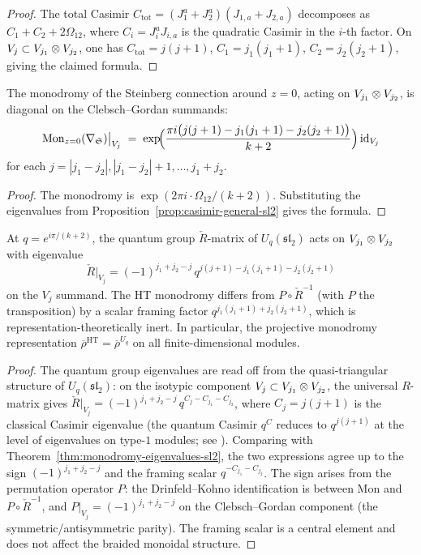 \begin{proof}
The total Casimir $C_{\mathrm{tot}} = (J^a_1 + J^a_2)(J_{1,a} + J_{2,a})$ decomposes as $C_1 + C_2 + 2\Omega_{12}$, where $C_i = J^a_i J_{i,a}$ is the quadratic Casimir in the $i$-th factor. On $V_j \subset V_{j_1} \otimes V_{j_2}$, one has $C_{\mathrm{tot}} = j(j+1)$, $C_1 = j_1(j_1+1)$, $C_2 = j_2(j_2+1)$, giving the claimed formula.
\end{proof}

\begin{theorem}
\label{thm:monodromy-eigenvalues-sl2}
The monodromy of the Steinberg connection around $z = 0$, acting on $V_{j_1} \otimes V_{j_2}$, is diagonal on the Clebsch--Gordan summands:
\[
 \mathrm{Mon}_{z=0}(\nabla_{\mathfrak{S}})\big|_{V_j}
 \;=\;
 \exp\!\Bigl(\frac{\pi i\bigl(j(j+1) - j_1(j_1+1) - j_2(j_2+1)\bigr)}{k+2}\Bigr)\,\mathrm{id}_{V_j}
\]
for each $j = |j_1 - j_2|, |j_1 - j_2| + 1, \dots, j_1 + j_2$.
\end{theorem}

\begin{proof}
The monodromy is $\exp(2\pi i \cdot \Omega_{12}/(k+2))$. Substituting the eigenvalues from Proposition~\ref{prop:casimir-general-sl2} gives the formula.
\end{proof}

\begin{corollary}
\label{cor:agreement-qgroup-sl2}
At $q = e^{i\pi/(k+2)}$, the quantum group $\check{R}$-matrix of $U_q(\mathfrak{sl}_2)$ acts on $V_{j_1} \otimes V_{j_2}$ with eigenvalue
\[
 \check{R}\big|_{V_j} = (-1)^{j_1+j_2-j}\,q^{j(j+1) - j_1(j_1+1) - j_2(j_2+1)}
\]
on the $V_j$ summand. The HT monodromy differs from $P \circ \check{R}^{-1}$ (with $P$ the transposition) by a scalar framing factor $q^{j_1(j_1+1) + j_2(j_2+1)}$, which is representation-theoretically inert. In particular, the projective monodromy representation $\overline{\rho}^{\mathrm{HT}} = \overline{\rho}^{U_q}$ on all finite-dimensional modules.
\end{corollary}

\begin{proof}
The quantum group eigenvalues are read off from the quasi-triangular structure of $U_q(\mathfrak{sl}_2)$: on the isotypic component $V_j \subset V_{j_1} \otimes V_{j_2}$, the universal $R$-matrix gives
$\check{R}\big|_{V_j} = (-1)^{j_1+j_2-j}\,q^{C_j - C_{j_1} - C_{j_2}}$,
where $C_j = j(j+1)$ is the classical Casimir eigenvalue (the quantum Casimir $q^{C}$ reduces to $q^{j(j+1)}$ at the level of eigenvalues on type-$1$ modules; see \cite{KL93}). Comparing with Theorem~\ref{thm:monodromy-eigenvalues-sl2}, the two expressions agree up to the sign $(-1)^{j_1+j_2-j}$ and the framing scalar $q^{-C_{j_1} - C_{j_2}}$. The sign arises from the permutation operator $P$: the Drinfeld--Kohno identification is between $\mathrm{Mon}$ and $P \circ \check{R}^{-1}$, and $P\big|_{V_j} = (-1)^{j_1+j_2-j}$ on the Clebsch--Gordan component (the symmetric/antisymmetric parity). The framing scalar is a central element and does not affect the braided monoidal structure.
\end{proof}


